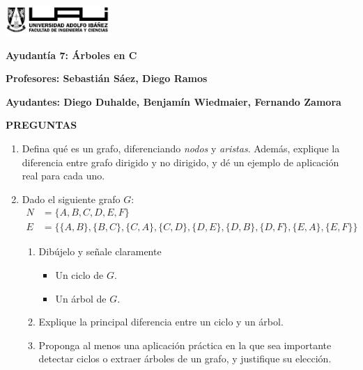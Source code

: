 \documentclass[12pt]{article}
\begin{document}
    \begin{titlepage}
        \centering
        \includegraphics[width=0.3\textwidth]{../imgs/logo-uai-fic.png}

        \vspace{0.5cm}
        \textbf{\fontsize{12}{24} Ayudantía 7: Árboles en C}

        \vspace{0.5cm}
        \textbf{\fontsize{12}{24}\selectfont Profesores: Sebastián Sáez, Diego Ramos}

        \begin{center}
            \textbf{\fontsize{12}{24}\selectfont Ayudantes: Diego Duhalde, Benjamín Wiedmaier, Fernando Zamora}
        \end{center}
        \begin{center}
            \textbf{PREGUNTAS}
        \end{center}

        \begin{enumerate}[leftmargin=*]
            \item Defina qué es un grafo, diferenciando \emph{nodos} y \emph{aristas}. Además, explique la diferencia entre grafo dirigido y no dirigido, y dé un ejemplo de aplicación real para cada uno.

            \item Dado el siguiente grafo $G$:
            \begin{align*}
                N &= \{ A, B, C, D, E, F\} \\
                E &= \{ \{A, B\}, \{B, C\}, \{C, A\}, \{C, D\}, \{D, E\}, \{D, B\}, \{D, F\}, \{E, A\}, \{E, F\} \}
            \end{align*}
            \begin{enumerate}[label=\alph*)]
                \item Dibújelo y señale claramente
                \begin{itemize}
                    \item Un ciclo de $G$.
                    \item Un árbol de $G$.
                \end{itemize}
                \item Explique la principal diferencia entre un ciclo y un árbol.
                \item Proponga al menos una aplicación práctica en la que sea importante detectar ciclos o extraer árboles de un grafo, y justifique su elección.
            \end{enumerate}
            

\end{enumerate}
\end{titlepage}
\end{document}
